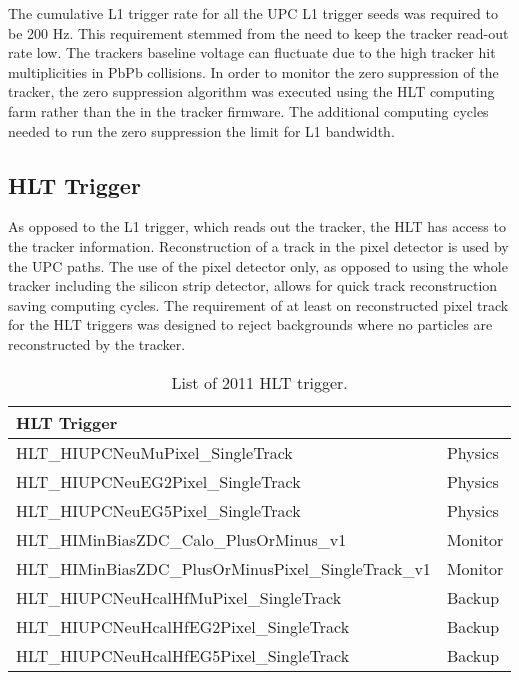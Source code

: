       The cumulative L1 trigger rate for all the UPC L1 trigger seeds was
        required to be 200 Hz.
      This requirement stemmed from the need to keep the tracker read-out rate
        low. 
      The trackers baseline voltage can fluctuate due to the high tracker hit 
        multiplicities in PbPb collisions.
      In order to monitor the zero suppression of the tracker, the zero 
        suppression algorithm was executed using the HLT computing farm 
	      rather than the in the tracker firmware. 
      The additional computing cycles needed to run the zero suppression 
        the limit for L1 bandwidth. 

    \subsection{HLT Trigger}
      As opposed to the L1 trigger, which reads out the tracker, the HLT has 
        access to the tracker information. 
      Reconstruction of a track in the pixel detector is used by the UPC paths.
      The use of the pixel detector only, as opposed to using the whole tracker 
        including the silicon strip detector, allows for quick track 
	reconstruction saving computing cycles.
      The requirement of at least on reconstructed pixel track for the HLT 
        triggers was designed to reject backgrounds where no particles are 
	reconstructed by the tracker. 
  \begin{table}[h]
		\centering
		\begin{tabular}{|l|l|}
		  \hline HLT Trigger  \\ \hline \hline
		  HLT\_HIUPCNeuMuPixel\_SingleTrack & Physics   \\ \hline
		  HLT\_HIUPCNeuEG2Pixel\_SingleTrack & Physics   \\ \hline
		  HLT\_HIUPCNeuEG5Pixel\_SingleTrack & Physics   \\ \hline
		  HLT\_HIMinBiasZDC\_Calo\_PlusOrMinus\_v1  & Monitor  \\ \hline
		  HLT\_HIMinBiasZDC\_PlusOrMinusPixel\_SingleTrack\_v1   & Monitor \\ \hline
		  HLT\_HIUPCNeuHcalHfMuPixel\_SingleTrack & Backup   \\ \hline
		  HLT\_HIUPCNeuHcalHfEG2Pixel\_SingleTrack & Backup   \\ \hline
		  HLT\_HIUPCNeuHcalHfEG5Pixel\_SingleTrack & Backup   \\ \hline \hline
		\end{tabular}
		\caption{List of 2011 HLT trigger.}
		\label{tab:hltTriggers2011}
	\end{table}

